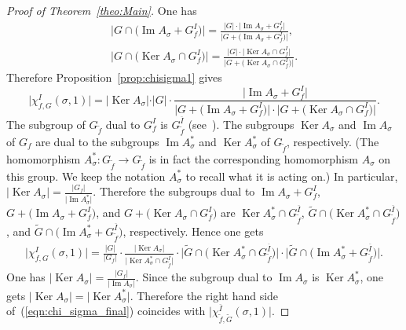 \documentclass[pdftex]{sigma}
\numberwithin{equation}{section}
\begin{document}
\begin{proof}[Proof of Theorem~\ref{theo:Main}]
One has
\begin{gather*}
\big\vert G\cap\big(\operatorname{Im}A_{\sigma} + G_f^I\big)\big\vert =
\frac{\vert G\vert\cdot\big\vert\operatorname{Im}A_{\sigma} + G_f^I\big\vert}{\big\vert G+\big(\operatorname{Im}A_{\sigma} + G_f^I\big)\big\vert}, \\
\big\vert G\cap\big(\operatorname{Ker}A_{\sigma}\cap G_f^I\big)\big\vert =
\frac{\vert G\vert\cdot\big\vert\operatorname{Ker}A_{\sigma}\cap G_f^I\big\vert}{\big\vert G+\big(\operatorname{Ker}A_{\sigma}\cap G_f^I\big)\big\vert}.
\end{gather*}
Therefore Proposition~\ref{prop:chisigma1} gives
\[
 \big\vert \chi_{f,G}^I(\sigma,1)\big\vert=\vert\operatorname{Ker}A_{\sigma}\vert\cdot\vert G\vert\cdot
\frac{\big\vert\operatorname{Im}A_{\sigma}+ G_f^I\big\vert}
{\big\vert G+\big(\operatorname{Im}A_{\sigma}+ G_f^I\big)\big\vert\cdot\big\vert G+\big(\operatorname{Ker}A_{\sigma}\cap G_f^I\big)\big\vert}.
\]
The subgroup of $G_{\widetilde{f}}$ dual to $G_f^I$ is $G_{\widetilde{f}}^{\overline{I}}$
(see~\cite[Lemma~1]{EG-BLMS}).
The subgroups $\operatorname{Ker}A_{\sigma}$ and $\operatorname{Im}A_{\sigma}$ of $G_f$ are dual to the subgroups
$\operatorname{Im}A^*_{\sigma}$ and $\operatorname{Ker}A^*_{\sigma}$ of $G_{\widetilde{f}}$, respectively.
(The homomorphism $A^*_{\sigma}\colon G_{\widetilde{f}}\to G_{\widetilde{f}}$ is in fact the corresponding homomorphism
$A_{\sigma}$ on this group. We keep the notation $A^*_{\sigma}$ to recall what it is acting on.) In particular,
$\vert \operatorname{Ker}A_{\sigma}\vert=\frac{\vert G_f\vert}{\vert \operatorname{Im}A^*_{\sigma}\vert}$.
Therefore the subgroups dual to $\operatorname{Im}A_{\sigma}+ G_f^I$, $G+\big(\operatorname{Im}A_{\sigma}+ G_f^I\big)$, and
$G+\big(\operatorname{Ker}A_{\sigma}\cap G_f^I\big)$ are $\operatorname{Ker}A^*_{\sigma}\cap G_{\widetilde{f}}^{\overline{I}}$,
$\widetilde{G}\cap\big(\operatorname{Ker}A^*_{\sigma} \cap G_{\widetilde{f}}^{\overline{I}}\big)$, and
$\widetilde{G} \cap\big(\operatorname{Im}A^*_{\sigma} + G_{\widetilde{f}}^{\overline{I}}\big)$, respectively. Hence one gets
\begin{gather}\label{eqn:chi_sigma_final}
 \big\vert \chi_{f,G}^I(\sigma,1) \big\vert =
 \frac{\vert G \vert}{\vert G_f \vert} \cdot \frac{\vert\operatorname{Ker}
 A_{\sigma}\vert}{\big\vert\operatorname{Ker}A^*_{\sigma} \cap G_{\widetilde{f}}^{\overline{I}}\big\vert}\cdot
 \big\vert\widetilde{G}\cap\big(\operatorname{Ker}A^*_{\sigma} \cap G_{\widetilde{f}}^{\overline{I}}\big)\big\vert
 \cdot
 \big\vert\widetilde{G}\cap\big(\operatorname{Im}A^*_{\sigma}+ G_{\widetilde{f}}^{\overline{I}}\big)\big\vert.
\end{gather}
One has $\vert\operatorname{Ker}A_{\sigma}\vert=\frac{\vert G_f\vert}{\vert\operatorname{Im}A_{\sigma}\vert}$. Since the subgroup
dual to $\operatorname{Im}A_{\sigma}$ is $\operatorname{Ker}A^*_{\sigma}$, one gets
$\vert\operatorname{Ker}A_{\sigma}\vert=\vert\operatorname{Ker}A^*_{\sigma}\vert$. Therefore the right hand side of~(\ref{eqn:chi_sigma_final}) coincides with $\big\vert \chi_{\widetilde{f},\widetilde{G}}^{\overline{I}}(\sigma,1) \big\vert$.


\end{proof}
\end{document}

